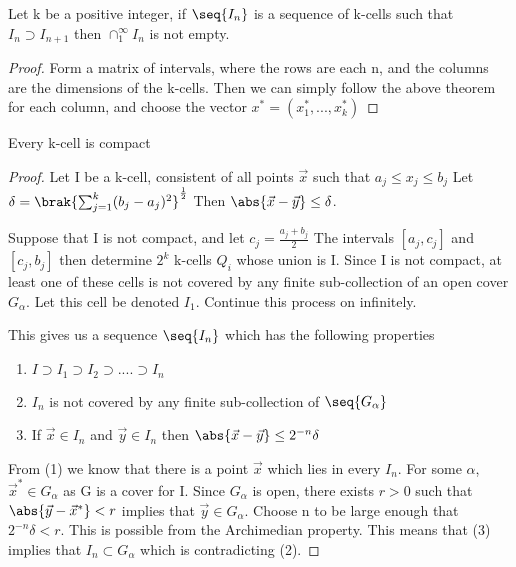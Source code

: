 \documentclass[12pt, letterpaper]{paper}
\begin{document}
\begin{theorem}
  \label{thr:2.39}
  Let k be a positive integer, if $\seq{I_n}$ is a sequence of k-cells
  such that $I_n \supset I_{n+1}$ then $\cap_1^{\infty} I_n$ is not
  empty.
\end{theorem}
\begin{proof}
  Form a matrix of intervals, where the rows are each n, and the
  columns are the dimensions of the k-cells. Then we can simply follow
  the above theorem for each column, and choose the vector
  $x^* = ( x_1^*, ..., x_k^* )$
\end{proof}

\begin{theorem}
  \label{thr:2.40}
  Every k-cell is compact
\end{theorem}
\begin{proof}
  Let I be a k-cell, consistent of all points $\vec{x}$ such that
  $a_j \leq x_j \leq b_j$ Let
  $\delta = \brak{\sum_{j=1}^k ( b_j - a_j )^2}^{\frac{1}{2}}$ Then
  $\abs{\vec{x} - \vec{y}} \leq \delta$.

  Suppose that I is not compact, and let $c_j = \frac{a_j + b_j}{2}$
  The intervals $[a_j,c_j]$ and $[c_j,b_j]$ then determine $2^k$
  k-cells $Q_i$ whose union is I. Since I is not compact, at least one
  of these cells is not covered by any finite sub-collection of an
  open cover $G_{\alpha}$. Let this cell be denoted $I_1$. Continue
  this process on infinitely.

  This gives us a sequence $\seq{I_n}$ which has the following
  properties
  \begin{enumerate}
  \item $I \supset I_1 \supset I_2 \supset .... \supset I_n$
  \item $I_n$ is not covered by any finite sub-collection of
    $\seq{G_{\alpha}}$
  \item If $\vec{x} \in I_n$ and $\vec{y} \in I_n$ then
    $\abs{ \vec{x} - \vec{y}} \leq 2^{-n} \delta$
  \end{enumerate}
  From (1) we know that there is a point $\vec{x}$ which lies in every
  $I_n$. For some $\alpha$, $\vec{x}^{*} \in G_{\alpha}$ as G is a
  cover for I. Since $G_{\alpha}$ is open, there exists $r > 0$ such
  that $\abs{\vec{y} - \vec{x}^{*}} < r$ implies that
  $\vec{y} \in G_{\alpha}$.  Choose n to be large enough that
  $2^{-n}\delta < r$. This is possible from the Archimedian
  property. This means that (3) implies that $I_n \subset G_{\alpha}$
  which is contradicting (2).
\end{proof}
\end{document}
